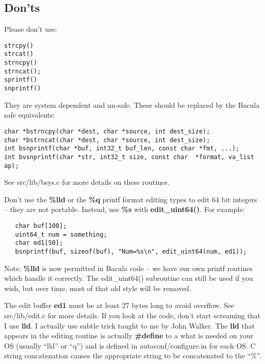 \subsection{Don'ts}

Please don't use:

\footnotesize
\begin{verbatim}
strcpy()
strcat()
strncpy()
strncat();
sprintf()
snprintf()
\end{verbatim}
\normalsize

They are system dependent and un-safe. These should be replaced by the Bacula
safe equivalents:

\footnotesize
\begin{verbatim}
char *bstrncpy(char *dest, char *source, int dest_size);
char *bstrncat(char *dest, char *source, int dest_size);
int bsnprintf(char *buf, int32_t buf_len, const char *fmt, ...);
int bvsnprintf(char *str, int32_t size, const char  *format, va_list ap);
\end{verbatim}
\normalsize

See src/lib/bsys.c for more details on these routines.

Don't use the {\bf \%lld} or the {\bf \%q} printf format editing types to edit
64 bit integers -- they are not portable. Instead, use {\bf \%s} with {\bf
edit\_uint64()}. For example:

\footnotesize
\begin{verbatim}
   char buf[100];
   uint64_t num = something;
   char ed1[50];
   bsnprintf(buf, sizeof(buf), "Num=%s\n", edit_uint64(num, ed1));
\end{verbatim}
\normalsize

Note: {\bf \%lld} is now permitted in Bacula code -- we have our
own printf routines which handle it correctly. The edit\_uint64() subroutine
can still be used if you wish, but over time, most of that old style will
be removed.

The edit buffer {\bf ed1} must be at least 27 bytes long to avoid overflow.
See src/lib/edit.c for more details. If you look at the code, don't start
screaming that I use {\bf lld}. I actually use subtle trick taught to me by
John Walker. The {\bf lld} that appears in the editing routine is actually
{\bf \#define} to a what is needed on your OS (usually ``lld'' or ``q'') and
is defined in autoconf/configure.in for each OS. C string concatenation causes
the appropriate string to be concatenated to the ``\%''.

